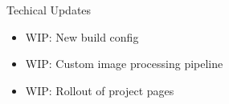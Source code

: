 \begin{frame}{Techical Updates}
    \begin{itemize}
        \item WIP: New build config
        \item WIP: Custom image processing pipeline
        \item WIP: Rollout of project pages
    \end{itemize}
\end{frame}





